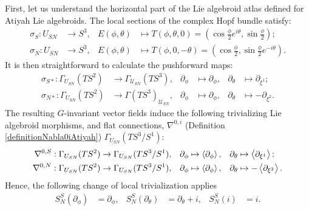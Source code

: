 First, let us understand the horizontal part of the Lie algebroid atlas defined for Atiyah Lie algebroids. The local sections of the complex Hopf bundle satisfy:
\begin{align*}
    \sigma_S : U_{SN} &\to S^3, &       E(\phi, \theta) &\mapsto T(\phi, \theta, 0) = (\cos \frac{\phi}{2} e^{i \theta}, \sin \frac{\phi}{2} );\\
    \sigma_N : U_{SN} &\to S^3, &       E(\phi, \theta) &\mapsto T(\phi, 0, -\theta) = (\cos \frac{\phi}{2} , \sin \frac{\phi}{2} e^{-i \theta}).
\end{align*}
It is then straightforward to calculate the pushforward maps:
\begin{align*}
    \sigma_{S*} : \Gamma_{U_{SN}}(TS^2) &\to \Gamma_{\mathcal U_{SN}}(TS^3), & \partial_\phi &\mapsto \partial_\phi, & \partial_\theta &\mapsto \partial_{\xi^1};   \\
    \sigma_{N*} : \Gamma_{U_{SN}}(TS^2) &\to \Gamma(TS^3)_{\mathcal U_{SN}}, & \partial_\phi &\mapsto \partial_\phi, & \partial_\theta &\mapsto -\partial_{\xi^2}.
\end{align*}
The resulting $G$-invariant vector fields induce the following trivializing Lie algebroid morphisms, and flat connections, $\nabla^{0,i}$ (Definition \ref{definitionNabla0iAtiyah}) $\Gamma_{U_{SN}}(TS^3/S^1)$:
\begin{align}
    \nabla^{0,S} : \Gamma_{U_{SN}}(TS^2) &\to \Gamma_{U_{SN}}(TS^3/S^1), & \partial_\phi &\mapsto \cl{\partial_\phi}, & \partial_\theta &\mapsto \cl{\partial_{\xi^1}};   \\
    \nabla^{0,N} : \Gamma_{U_{SN}}(TS^2) &\to \Gamma_{U_{SN}}(TS^3/S^1), & \partial_\phi &\mapsto \cl{\partial_\phi}, & \partial_\theta &\mapsto -\cl{\partial_{\xi^2}}.
\end{align}
Hence, the following change of local trivialization applies
\begin{align*}
    S^S_N(\partial_\phi) &= \partial_\phi, &  S^S_N(\partial_\theta) &= \partial_\theta + i, & S^S_N(i) &= i.
\end{align*}


